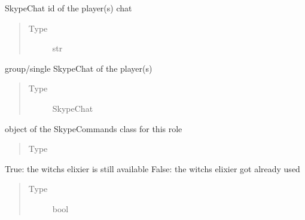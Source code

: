 \documentclass[letterpaper,10pt,english]{sphinxmanual}
\begin{document}
\begin{fulllineitems}
\begin{fulllineitems}
\begin{quote}
\begin{description}
\end{description}\end{quote}

\end{fulllineitems}



\begin{fulllineitems}
SkypeChat id of the player(s) chat
\begin{quote}\begin{description}
\item[{Type}] \leavevmode
str

\end{description}\end{quote}

\end{fulllineitems}



\begin{fulllineitems}
group/single SkypeChat of the player(s)
\begin{quote}\begin{description}
\item[{Type}] \leavevmode
SkypeChat

\end{description}\end{quote}

\end{fulllineitems}



\begin{fulllineitems}
object of the SkypeCommands class for this role
\begin{quote}\begin{description}
\item[{Type}] \leavevmode
{\hyperref[\detokenize{chatwolf:chatwolf.skypecommands.SkypeCommands}]{}}

\end{description}\end{quote}

\end{fulllineitems}



\begin{fulllineitems}
True: the witchs elixier is still available
False: the witchs elixier got already used
\begin{quote}\begin{description}
\item[{Type}] \leavevmode
bool


\end{description}
\end{quote}
\end{fulllineitems}
\end{fulllineitems}
\end{document}
